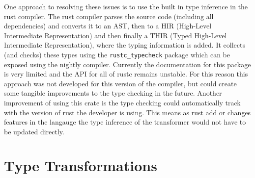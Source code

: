 \documentclass[ oneside,%
                    author={James Elgar},
                    degree={MEng},
                     title={Bidirectional transformer between functional and \\ object-oriented programming in Rust},
                  subtitle={}]{dissertation}
\begin{document}
One approach to resolving these issues is to use the built in type inference in the rust compiler. The rust compiler parses the source code (including all dependencies) and converts it to an AST, then to a HIR (High-Level Intermediate Representation) and then finally a THIR (Typed High-Level Intermediate Representation), where the typing information is added. It collects (and checks) these types using the \verb|rustc_typecheck| package which can be exposed using the nightly compiler. Currently the documentation for this package is very limited and the API for all of rustc remains unstable. For this reason this approach was not developed for this version of the compiler, but could create some tangible improvements to the type checking in the future. Another improvement of using this crate is the type checking could automatically track with the version of rust the developer is using. This means as rust add or changes features in the langauge the type inference of the transformer would not have to be updated directly.

\section{Type Transformations}
\end{document}
